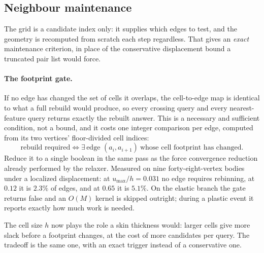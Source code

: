 \documentclass[11pt]{article}
\begin{document}
\subsection{Neighbour maintenance}
\label{sec:neighbours}

The grid is a candidate index only: it supplies which edges to test, and the geometry is recomputed from scratch each step regardless. That gives an \emph{exact} maintenance criterion, in place of the conservative displacement bound a truncated pair list would force.

\paragraph{The footprint gate.} If no edge has changed the set of cells it overlaps, the cell-to-edge map is identical to what a full rebuild would produce, so every crossing query and every nearest-feature query returns exactly the rebuilt answer. This is a necessary and sufficient condition, not a bound, and it costs one integer comparison per edge, computed from its two vertices' floor-divided cell indices:
\begin{equation}
\boxed{\;\text{rebuild required} \iff \exists\,\text{edge } (a_i,a_{i+1}) \ \text{whose cell footprint has changed.}\;}
\label{eq:footprint}
\end{equation}
Reduce it to a single boolean in the same pass as the force convergence reduction already performed by the relaxer. Measured on nine forty-eight-vertex bodies under a localized displacement: at $u_{\max}/h = 0.031$ no edge requires rebinning, at $0.12$ it is $2.3\%$ of edges, and at $0.65$ it is $5.1\%$. On the elastic branch the gate returns false and an $O(M)$ kernel is skipped outright; during a plastic event it reports exactly how much work is needed.

The cell size $h$ now plays the role a skin thickness would: larger cells give more slack before a footprint changes, at the cost of more candidates per query. The tradeoff is the same one, with an exact trigger instead of a conservative one.
\end{document}
